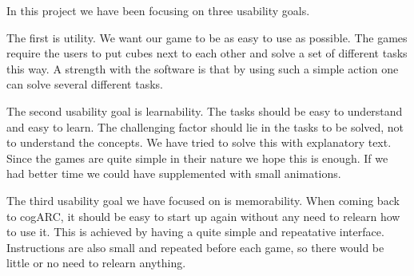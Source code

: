 In this project we have been focusing on three usability goals\cite{rogers2011interaction}.

The first is utility. We want our game to be as easy to use as possible. The
games require the users to put cubes next to each other and solve a set of
different tasks this way. A strength with the software is that by using such
a simple action one can solve several different tasks.

The second usability goal is learnability. The tasks should be easy to
understand and easy to learn. The challenging factor should lie in the tasks
to be solved, not to understand the concepts. We have tried to solve this
with explanatory text. Since the games are quite simple in their nature we
hope this is enough. If we had better time we could have supplemented with
small animations.

The third usability goal we have focused on is memorability. When coming back
to cogARC, it should be easy to start up again without any need to relearn how
to use it. This is achieved by having a quite simple and repeatative interface.
Instructions are also small and repeated before each game, so there would be
little or no need to relearn anything.